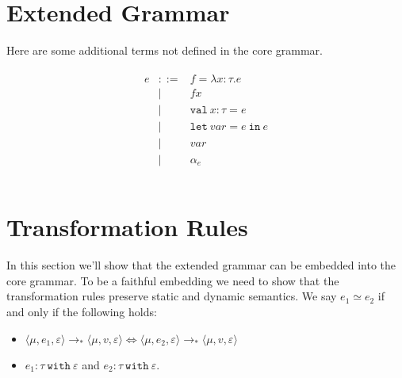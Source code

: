 \documentclass{llncs}
\newcommand{\keywadj}[1]{\mathtt{#1}}
\newcommand{\keyw}[1]{\keywadj{#1}~}
\newcommand{\config}[1] { \langle #1 \rangle }
\begin{document}
\section{Extended Grammar}

Here are some additional terms not defined in the core grammar.

\[
\begin{array}{lll}
\begin{array}{lllr}

	e & ::= & f = \lambda x : \tau . e\\
  		& | & f x\\
  		& | & \keyw{val} x : \tau = e\\
  		& | & \keyw{let} var = e~\keyw{in} e\\
  		& | & var\\
  		& | & \alpha_e\\
		&&\\
\end{array}
\end{array}
\]



\section{Transformation Rules}

In this section we'll show that the extended grammar can be embedded into the core grammar. To be a faithful embedding we need to show that the transformation rules preserve static and dynamic semantics. We say $e_1 \simeq e_2$ if and only if the following holds:
\begin{itemize}
	\item $\config{\mu, e_1, \varepsilon} \longrightarrow_* \config{\mu, v, \varepsilon} \iff \config{\mu, e_2, \varepsilon} \longrightarrow_* \config{\mu, v, \varepsilon}$
	\item $e_1 : \tau~\keyw{with} \varepsilon$ and $e_2 : \tau~\keyw{with} \varepsilon$.
\end{itemize}

\paragraph{}

\end{document}
